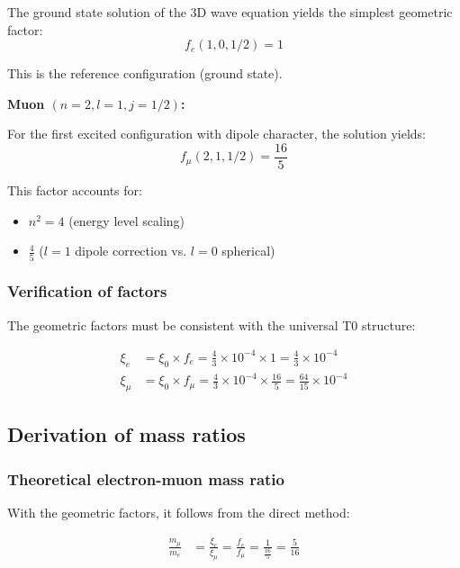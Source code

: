 The ground state solution of the 3D wave equation yields the simplest geometric factor:
\begin{equation}
	f_e(1,0,1/2) = 1
\end{equation}

This is the reference configuration (ground state).

\textbf{Muon $(n=2, l=1, j=1/2)$:}

For the first excited configuration with dipole character, the solution yields:
\begin{equation}
	f_\mu(2,1,1/2) = \frac{16}{5}
\end{equation}

This factor accounts for:
\begin{itemize}
	\item $n^2 = 4$ (energy level scaling)
	\item $\frac{4}{5}$ ($l=1$ dipole correction vs. $l=0$ spherical)
\end{itemize}

\subsubsection{Verification of factors}

The geometric factors must be consistent with the universal T0 structure:

\begin{align}
	\xi_e &= \xi_0 \times f_e = \frac{4}{3} \times 10^{-4} \times 1 = \frac{4}{3} \times 10^{-4}\\
	\xi_\mu &= \xi_0 \times f_\mu = \frac{4}{3} \times 10^{-4} \times \frac{16}{5} = \frac{64}{15} \times 10^{-4}
\end{align}

\subsection{Derivation of mass ratios}

\subsubsection{Theoretical electron-muon mass ratio}

With the geometric factors, it follows from the direct method:

\begin{align}
	\frac{m_\mu}{m_e} &= \frac{\xi_e}{\xi_\mu} = \frac{f_e}{f_\mu} = \frac{1}{\frac{16}{5}} = \frac{5}{16}
\end{align}

